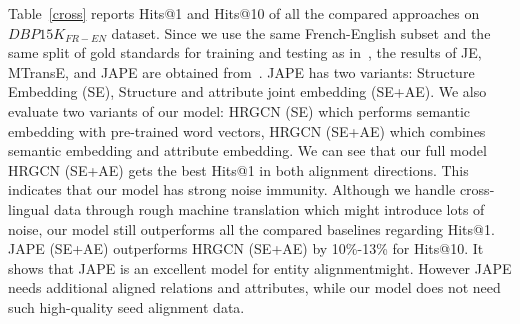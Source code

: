 	Table~\ref{cross} reports Hits@1 and Hits@10 of all the compared approaches on $DBP15K_{FR-EN}$ dataset. Since we use the same French-English subset and the same split of gold standards for training and testing as in~\cite{sun2017cross}, the results of JE, MTransE, and JAPE are obtained from~\cite{sun2017cross}. JAPE has two variants: Structure Embedding (SE), Structure and attribute joint embedding (SE+AE). We also evaluate two variants of our model: HRGCN (SE) which performs semantic embedding with pre-trained word vectors, HRGCN (SE+AE) which combines semantic embedding and attribute embedding. We can see that our full model HRGCN (SE+AE) gets the best Hits@1 in both alignment directions. This indicates that our model has strong noise immunity. Although we handle cross-lingual data through rough machine translation which might introduce lots of noise, our model still outperforms all the compared baselines regarding Hits@1. JAPE (SE+AE) outperforms HRGCN (SE+AE) by 10\%-13\% for Hits@10. It shows that JAPE is an
	excellent model for entity alignmentmight. However JAPE needs additional aligned relations and attributes, while our model does not need such high-quality seed alignment data.
	
